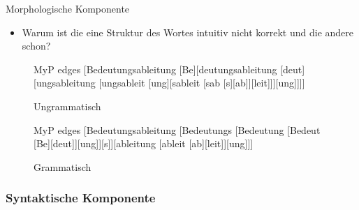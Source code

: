 \begin{frame}{Morphologische Komponente}

	\begin{itemize}
		\item Warum ist die eine Struktur des Wortes  intuitiv nicht korrekt und die andere schon?
	\end{itemize}
			

	
\begin{figure}[b]
	
	\begin{minipage}[b]{0.37\textwidth}
					\tiny{
		\begin{forest}MyP edges
		[Bedeutungsableitung [Be][deutungsableitung [deut][ungsableitung [ungsableit [ung][sableit [sab [s][ab]][leit]]][ung]]]]
		\end{forest}}
		
	\caption{Ungrammatisch}
	\end{minipage}
	\begin{minipage}[b]{0.20\textwidth}
	\end{minipage}
	\begin{minipage}[b]{0.37\textwidth}
	\tiny{
		\begin{forest}MyP edges
		[Bedeutungsableitung [Bedeutungs [Bedeutung [Bedeut [Be][deut]][ung]][s]][ableitung [ableit [ab][leit]][ung]]]
		\end{forest}}
			
	\caption{Grammatisch}
	\end{minipage}
	                        
\end{figure}

\end{frame}


\subsubsection{Syntaktische Komponente}
	
